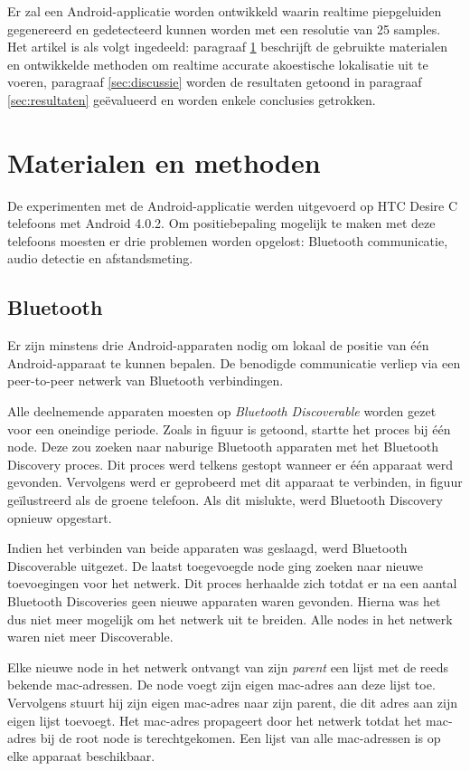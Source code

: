 \documentclass[12pt]{article}
\begin{document}
Er zal een Android-applicatie worden ontwikkeld waarin realtime piepgeluiden gegenereerd en gedetecteerd kunnen worden met een resolutie van 25 samples. Het artikel is als volgt ingedeeld: paragraaf \ref{sec:materialen} beschrijft de gebruikte materialen en ontwikkelde methoden om realtime accurate akoestische lokalisatie uit te voeren, paragraaf \ref{sec:discussie} worden de resultaten getoond in paragraaf \ref{sec:resultaten} ge\"evalueerd en worden enkele conclusies getrokken.

\section{Materialen en methoden}
\label{sec:materialen}
De experimenten met de Android-applicatie werden uitgevoerd op HTC Desire C telefoons met Android 4.0.2. Om positiebepaling mogelijk te maken met deze telefoons moesten er drie problemen worden opgelost: Bluetooth communicatie, audio detectie en afstandsmeting.

\subsection{Bluetooth}
Er zijn minstens drie Android-apparaten nodig om lokaal de positie van \'e\'en Android-apparaat te kunnen bepalen. De benodigde communicatie verliep via een peer-to-peer \cite{schollmeier2001definition} netwerk van Bluetooth \cite{haartsen2000bluetooth} verbindingen.

Alle deelnemende apparaten moesten op \textit{Bluetooth Discoverable} worden gezet voor een oneindige periode. Zoals in figuur is getoond, startte het proces bij \'e\'en node. Deze zou zoeken naar naburige Bluetooth apparaten met het Bluetooth Discovery proces. Dit proces werd telkens gestopt wanneer er \'e\'en apparaat werd gevonden. Vervolgens werd er geprobeerd met dit apparaat te verbinden, in figuur ge\"ilustreerd als de groene telefoon. Als dit mislukte, werd Bluetooth Discovery opnieuw opgestart.

Indien het verbinden van beide apparaten was geslaagd, werd Bluetooth Discoverable uitgezet. De laatst toegevoegde node ging zoeken naar nieuwe toevoegingen voor het netwerk. Dit proces herhaalde zich totdat er na een aantal Bluetooth Discoveries geen nieuwe apparaten waren gevonden. Hierna was het dus niet meer mogelijk om het netwerk uit te breiden. Alle nodes in het netwerk waren niet meer Discoverable.

Elke nieuwe node in het netwerk ontvangt van zijn \textit{parent} een lijst met de reeds bekende mac-adressen. De node voegt zijn eigen mac-adres aan deze lijst toe. Vervolgens stuurt hij zijn eigen mac-adres naar zijn parent, die dit adres aan zijn eigen lijst toevoegt. Het mac-adres propageert door het netwerk totdat het mac-adres bij de root node is terechtgekomen. Een lijst van alle mac-adressen is op elke apparaat beschikbaar. 
\end{document}
